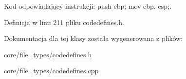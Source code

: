 Kod odpowiadający instrukcji\-: push ebp; mov ebp, esp;. 



Definicja w linii 211 pliku codedefines.\-h.



Dokumentacja dla tej klasy została wygenerowana z plików\-:\begin{DoxyCompactItemize}
\item 
core/file\-\_\-types/\hyperlink{codedefines_8h}{codedefines.\-h}\item 
core/file\-\_\-types/\hyperlink{codedefines_8cpp}{codedefines.\-cpp}\end{DoxyCompactItemize}
